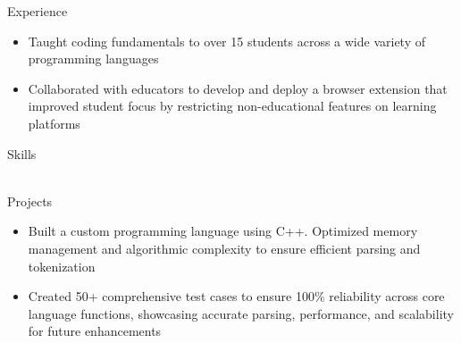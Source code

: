 \documentclass{resume}
\begin{document}
\begin{experienceSection}{Experience}
    \experienceItem[
        company={theCoderSchool},
        location={Berkeley Heights, NJ},
        position={Code Tutor},
        duration={March 2024 - August 2024}
    ]
    \begin{itemize}[itemsep=-6pt, leftmargin=2em, rightmargin=0.8em, before=\raggedright, after=\normalfont]
        \item Taught coding fundamentals to over 15 students across a wide variety of programming languages
        \item Collaborated with educators to develop and deploy a browser extension that improved student focus by restricting non-educational features on learning platforms
    \end{itemize}

\end{experienceSection}

\begin{skillsSection}{Skills}
    \skillItem[
        category={Languages},
        skills={Python, C, C++, JavaScript, TypeScript, Java, PHP, SQL}
    ] \\
    \skillItem[
        category={Full-Stack},
        skills={React, Next.js, Vue, Node.js, MongoDB, Zustand, Tailwind, Slack SDK, Zendesk API}
    ] \\
    \skillItem[
        category={DevOps \& Tooling},
        skills={AWS, Datadog, Kubernetes, Terraform, ArgoCD, CircleCI, Git, Bash}
    ]
\end{skillsSection}

\begin{experienceSection}{Projects}
    \projectItem[
        title={Mini C-Like Programming Language},
    ]
    \vspace{-0.5em}
    \begin{itemize}[topsep=0pt, itemsep=-6pt, leftmargin=2em, rightmargin=0.8em, before=\raggedright, after=\normalfont]
        \item Built a custom programming language using C++. Optimized memory management and algorithmic complexity to ensure efficient parsing and tokenization
        \item Created 50+ comprehensive test cases to ensure 100\% reliability across core language functions, showcasing accurate parsing, performance, and scalability for future enhancements
    \end{itemize}
\end{experienceSection}
\end{document}
